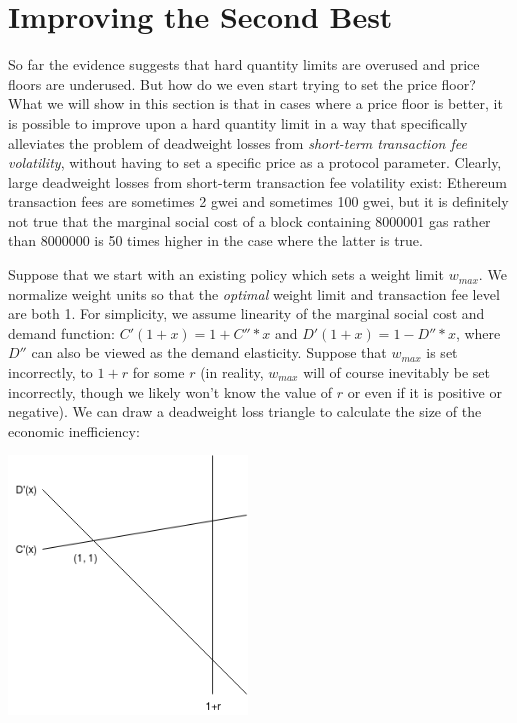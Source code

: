 \documentclass[12pt, final]{article}
\begin{document}
\section{Improving the Second Best}

So far the evidence suggests that hard quantity limits are overused and price floors are underused. But how do we even start trying to set the price floor? What we will show in this section is that in cases where a price floor is better, it is possible to improve upon a hard quantity limit in a way that specifically alleviates the problem of deadweight losses from \emph{short-term transaction fee volatility}, without having to set a specific price as a protocol parameter. Clearly, large deadweight losses from short-term transaction fee volatility exist: Ethereum transaction fees are sometimes 2 gwei and sometimes 100 gwei, but it is definitely not true that the marginal social cost of a block containing 8000001 gas rather than 8000000 is 50 times higher in the case where the latter is true.

Suppose that we start with an existing policy which sets a weight limit $w_{max}$. We normalize weight units so that the \emph{optimal} weight limit and transaction fee level are both 1. For simplicity, we assume linearity of the marginal social cost and demand function: $C'(1 + x) = 1 + C'' * x$ and $D'(1 + x) = 1 - D'' * x$, where $D''$ can also be viewed as the demand elasticity. Suppose that $w_{max}$ is set incorrectly, to $1 + r$ for some $r$ (in reality, $w_{max}$ will of course inevitably be set incorrectly, though we likely won't know the value of $r$ or even if it is positive or negative). We can draw a deadweight loss triangle to calculate the size of the economic inefficiency:

\begin{center}
\includegraphics[width=2.5in]{Triangle1.png} \\
\end{center}
\end{document}
